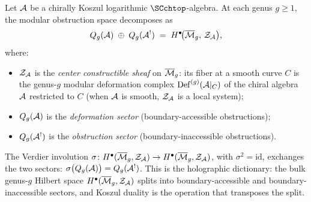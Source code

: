 \begin{theorem}
\label{thm:complementarity-holographic-dictionary}
Let $\mathcal{A}$ be a chirally Koszul logarithmic $\SCchtop$-algebra.
At each genus $g\ge 1$, the modular obstruction space
decomposes as
\begin{equation}\label{eq:complementarity-decomposition}
Q_g(\mathcal{A}) \;\oplus\; Q_g(\mathcal{A}^!)
\;=\;
H^\bullet\!\bigl(\overline{\mathcal{M}}_g,\, \mathcal{Z}_{\mathcal{A}}\bigr),
\end{equation}
where:
\begin{itemize}[leftmargin=1.8em]
\item $\mathcal{Z}_{\mathcal{A}}$ is the \emph{center constructible sheaf} on $\overline{\mathcal{M}}_g$: its fiber at a smooth curve $C$ is the genus-$g$ modular deformation complex $\mathrm{Def}^{(g)}(\mathcal{A}|_C)$ of the chiral algebra $\mathcal{A}$ restricted to $C$ (when $\mathcal{A}$ is smooth, $\mathcal{Z}_{\mathcal{A}}$ is a local system);
\item $Q_g(\mathcal{A})$ is the \emph{deformation sector}
 (boundary-accessible obstructions);
\item $Q_g(\mathcal{A}^!)$ is the \emph{obstruction sector}
 (boundary-inaccessible obstructions).
\end{itemize}
The Verdier involution
$\sigma\colon H^\bullet(\overline{\mathcal{M}}_g,\mathcal{Z}_{\mathcal{A}})\to H^\bullet(\overline{\mathcal{M}}_g,\mathcal{Z}_{\mathcal{A}})$,
with $\sigma^2=\mathrm{id}$, exchanges
the two sectors:
$\sigma\bigl(Q_g(\mathcal{A})\bigr)=Q_g(\mathcal{A}^!)$.
This is the holographic dictionary: the bulk genus-$g$ Hilbert
space $H^\bullet(\overline{\mathcal{M}}_g,\mathcal{Z}_{\mathcal{A}})$ splits into
boundary-accessible and boundary-inaccessible sectors, and
Koszul duality is the operation that transposes the split.
\end{theorem}

